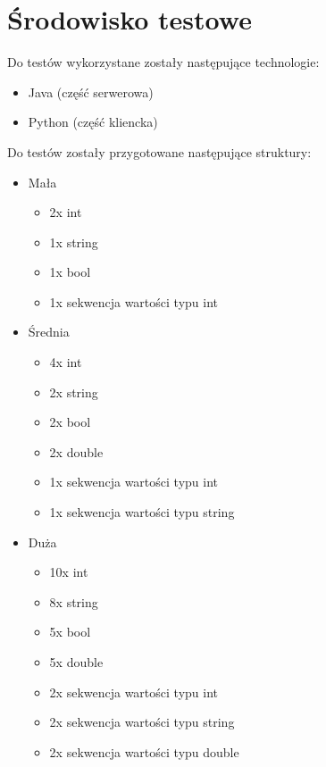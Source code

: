 \documentclass[12pt]{article}
\begin{document}
\section{Środowisko testowe}
Do testów wykorzystane zostały następujące technologie:
\begin{itemize}
    \item Java (część serwerowa)
    \item Python (część kliencka)
\end{itemize}
\vspace{\baselineskip}

Do testów zostały przygotowane następujące struktury:
\begin{itemize}
    \item Mała
        \begin{itemize}[label=-]
        \item 2x int
        \item 1x string
        \item 1x bool
        \item 1x sekwencja wartości typu int
        \end{itemize}
    \item Średnia
        \begin{itemize}[label=-]
        \item 4x int
        \item 2x string
        \item 2x bool
        \item 2x double
        \item 1x sekwencja wartości typu int
        \item 1x sekwencja wartości typu string
        \end{itemize}
    \item Duża
        \begin{itemize}[label=-]
        \item 10x int
        \item 8x string
        \item 5x bool
        \item 5x double
        \item 2x sekwencja wartości typu int
        \item 2x sekwencja wartości typu string
        \item 2x sekwencja wartości typu double
        \end{itemize}
\end{itemize}
\vspace{\baselineskip}
\end{document}
